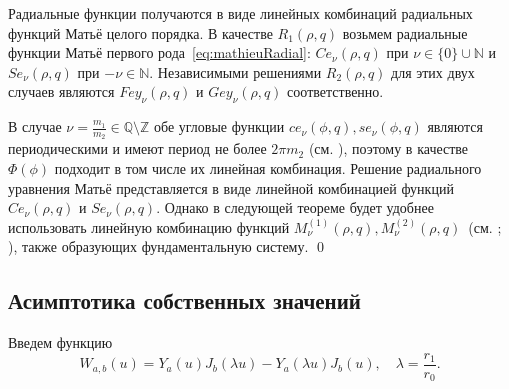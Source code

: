 Радиальные функции получаются в виде линейных комбинаций радиальных функций Матьё целого порядка. В качестве $R_1(\rho, q)$ возьмем радиальные функции Матьё первого рода~\ref{eq:mathieuRadial}: $Ce_\nu(\rho, q)$ при $\nu \in \{0\} \cup \mathbb{N}$ и $Se_\nu(\rho, q)$ при $-\nu \in \mathbb{N}$. Независимыми решениями $R_2(\rho, q)$ для этих двух случаев являются $Fey_\nu(\rho, q)$ и $Gey_\nu(\rho, q)$ соответственно.

В случае $\nu = \frac{m_1}{m_2} \in \mathbb{Q} \setminus \mathbb{Z}$ обе угловые функции $ce_\nu(\phi, q), se_\nu(\phi, q)$  являются периодическими и имеют период не более $2\pi m_2$ (см. \cite{wref2}), поэтому в качестве $\Phi(\phi)$ подходит в том числе их линейная комбинация. Решение радиального уравнения Матьё представляется в виде линейной комбинацией функций $Ce_\nu(\rho, q)$ и $Se_\nu(\rho, q)$. Однако в следующей теореме  будет удобнее использовать линейную комбинацию функций $M_\nu^{(1)}(\rho, q), M_\nu^{(2)}(\rho, q)$~(см. \cite[\S\ 28.23]{wref5}; \cite[гл.~2, \S\ 2.4, с.~165]{wref12}), также образующих фундаментальную систему.
\hfill\qed

\subsection{Асимптотика собственных значений}\label{sec:ch2/sec3/subs3}
Введем функцию 
\begin{equation}
W_{a, b}(u) = Y_a(u)J_b(\lambda u) - Y_a(\lambda u)J_b(u), \quad \lambda = \frac{r_1}{r_0}. 
\label{eq:YJdef}
\end{equation}

